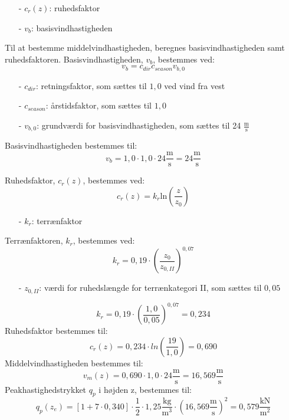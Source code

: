 \begin{itemize}
	\item[-] $c_r(z)$: ruhedsfaktor
	\item[-] $v_b$: basisvindhastigheden
\end{itemize}
Til at bestemme middelvindhastigheden, beregnes basisvindhastigheden samt ruhedsfaktoren.
\newline
\newline
Basisvindhastigheden, $v_b$, bestemmes ved:
\begin{equation}
	v_b=c_{dir}c_{season}v_{b,0}
\end{equation}
\begin{itemize}
	\item[-] $c_{dir}$: retningsfaktor, som sættes til $1,\!0$ ved vind fra vest \citep[ tabel 1a kapitel 4.2]{EU91}
	\item[-] $c_{season}$: årstidsfaktor, som sættes til $1,\!0$ \citep[ tabel 1b kapitel 4.2]{EU91}
	\item[-] $v_{b,0}$: grundværdi for basisvindhastigheden, som sættes til 24 $\frac{\text{m}}{\text{s}}$ \citep[ kapitel 4.2]{EU91}
\end{itemize}
Basisvindhastigheden bestemmes til:
\begin{equation}
	v_b=1,\!0\cdot 1,\!0\cdot 24 \frac{\text{m}}{\text{s}}=24 \frac{\text{m}}{\text{s}}
\end{equation}

Ruhedsfaktor, $c_r(z)$, bestemmes ved:
\begin{equation}
	c_r(z)=k_r \text{ln}(\frac{z}{z_0})
\end{equation}
\begin{itemize}
	\item[-] $k_r$: terrænfaktor
\end{itemize}

Terrænfaktoren, $k_r$, bestemmes ved:
\begin{equation}
	k_r=0,\!19\cdot (\frac{z_0}{z_{0,II}})^{0,07}
\end{equation}

\begin{itemize}
	\item[-] $z_{0,II}$: værdi for ruhedslængde for terrænkategori II, som sættes til $0,\!05$ \citep[ kapitel 4.3.2]{EU91}
\end{itemize}

\begin{equation}
	k_r=0,\!19\cdot (\frac{1,0}{0,05})^{0,07}=0,\!234
\end{equation}
Ruhedsfaktor bestemmes til:
\begin{equation}
	c_r(z)=0,\!234\cdot ln(\frac{19}{1,0})=0,\!690
\end{equation}
Middelvindhastigheden bestemmes til:
\begin{equation}
	v_m(z)=0,\!690\cdot 1,\!0\cdot 24 \frac{\text{m}}{\text{s}}=16,\!569 \frac{\text{m}}{\text{s}}
\end{equation}
Peakhastighedstrykket $q_p$ i højden z, bestemmes til:
\begin{equation}
	q_p(z_e)=[1+7\cdot 0,\!340]\cdot \frac{1}{2}\cdot 1,\!25 \frac{\text{kg}}{\text{m}^3}\cdot (16,\!569 \frac{\text{m}}{\text{s}})^2=0,\!579 \frac{\text{kN}}{\text{m}^2}
\end{equation}